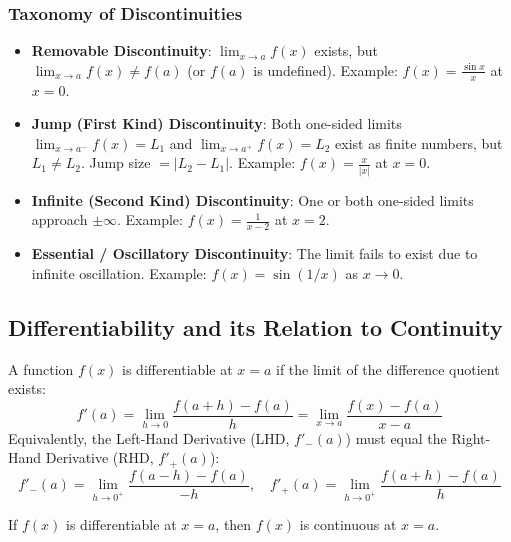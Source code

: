 \subsubsection{Taxonomy of Discontinuities}
\begin{itemize}[leftmargin=1.5em]
    \item \textbf{Removable Discontinuity}: $\lim_{x\to a} f(x)$ exists, but $\lim_{x\to a} f(x) \ne f(a)$ (or $f(a)$ is undefined). Example: $f(x) = \frac{\sin x}{x}$ at $x=0$.
    \item \textbf{Jump (First Kind) Discontinuity}: Both one-sided limits $\lim_{x\to a^-} f(x) = L_1$ and $\lim_{x\to a^+} f(x) = L_2$ exist as finite numbers, but $L_1 \ne L_2$. Jump size $= |L_2 - L_1|$. Example: $f(x) = \frac{x}{|x|}$ at $x=0$.
    \item \textbf{Infinite (Second Kind) Discontinuity}: One or both one-sided limits approach $\pm\infty$. Example: $f(x) = \frac{1}{x-2}$ at $x=2$.
    \item \textbf{Essential / Oscillatory Discontinuity}: The limit fails to exist due to infinite oscillation. Example: $f(x) = \sin(1/x)$ as $x \to 0$.
\end{itemize}

\subsection{Differentiability and its Relation to Continuity}

\begin{definition}
A function $f(x)$ is differentiable at $x = a$ if the limit of the difference quotient exists:
\begin{equation}
    f'(a) = \lim_{h\to 0} \frac{f(a+h) - f(a)}{h} = \lim_{x\to a} \frac{f(x) - f(a)}{x - a}
\end{equation}
Equivalently, the Left-Hand Derivative (LHD, $f'_-(a)$) must equal the Right-Hand Derivative (RHD, $f'_+(a)$):
\begin{equation}
    f'_-(a) = \lim_{h\to 0^+} \frac{f(a-h) - f(a)}{-h}, \quad f'_+(a) = \lim_{h\to 0^+} \frac{f(a+h) - f(a)}{h}
\end{equation}
\end{definition}

\begin{theorem}
If $f(x)$ is differentiable at $x = a$, then $f(x)$ is continuous at $x = a$.
\end{theorem}

